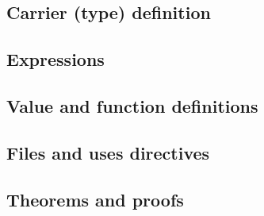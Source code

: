 \subsection{Carrier (type) definition}

\subsection{Expressions}

\subsection{Value and function definitions}

\subsection{Files and uses directives}

\subsection{Theorems and proofs}
